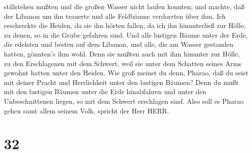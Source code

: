 stillstehen mußten und die großen Wasser nicht laufen konnten; und
machte, daß der Libanon um ihn trauerte und alle Feldbäume verdorrten
über ihm.  Ich erschreckte die Heiden, da sie ihn hörten
fallen, da ich ihn hinunterließ zur Hölle, zu denen, so in die Grube
gefahren sind. Und alle lustigen Bäume unter der Erde, die edelsten und
besten auf dem Libanon, und alle, die am Wasser gestanden hatten,
gönnten's ihm wohl.  Denn sie mußten auch mit ihm hinunter
zur Hölle, zu den Erschlagenen mit dem Schwert, weil sie unter dem
Schatten seines Arms gewohnt hatten unter den Heiden.  Wie
groß meinst du denn, Pharao, daß du seist mit deiner Pracht und
Herrlichkeit unter den lustigen Bäumen? Denn du mußt mit den lustigen
Bäumen unter die Erde hinabfahren und unter den Unbeschnittenen liegen,
so mit dem Schwert erschlagen sind. Also soll es Pharao gehen samt allem
seinem Volk, spricht der Herr HERR.

\hypertarget{section-31}{%
\section{32}\label{section-31}}

